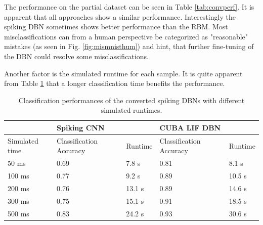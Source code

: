 
The performance on the partial dataset can be seen in Table \ref{tab:convperf}.
It is apparent that all approaches show a similar performance. Interestingly the spiking DBN sometimes shows better performance than the RBM.
Most misclassifications can from a human perspective be categorized as "reasonable" mistakes (as seen in Fig. \ref{fig:mismnisthum}) and hint, that further fine-tuning of the DBN could resolve some misclassifications.

Another factor is the simulated runtime for each sample. 
It is quite apparent from Table \ref{tab:pervovert} that a longer classification time benefits the performance.


\begin{table}[]
\centering
\caption{Classification performances of the converted spiking DBNs with different simulated runtimes.}
\label{tab:pervovert}
\begin{tabularx}{\textwidth}{l|ll|ll}
\hline
	 				& \multicolumn{2}{l}{Spiking CNN}   & \multicolumn{2}{|l}{CUBA LIF DBN} \\ \hline
Simulated time		 				& Classification Accuracy    & Runtime & Classification Accuracy    & Runtime \\ \hline
50 ms    	& 0.69 & 7.8 s 		& 0.81 & 8.1 s               \\
100 ms     	& 0.77 & 9.2 s  	& 0.89 & 10.5 s              \\
200 ms    	& 0.76 & 13.1 s   & 0.89 & 14.6 s             \\
300 ms    	& 0.75 & 15.1 s   & 0.91 & 18.5 s             \\
500 ms     	& 0.83 & 24.2 s    & 0.93 & 30.6 s             \\\hline
\end{tabularx}
\end{table}

